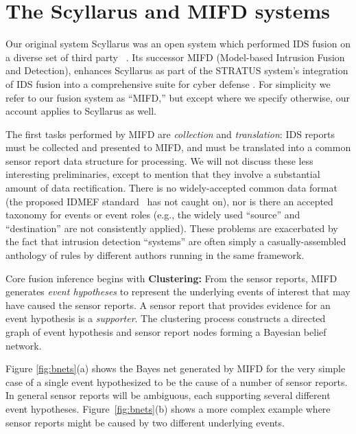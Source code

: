 \section{The Scyllarus and MIFD systems}
\label{sec:mifd}

Our original system Scyllarus was an open system which performed IDS
fusion on a diverse set of third party \idses~.
Its successor
MIFD (Model-based Intrusion Fusion and Detection),
enhances Scyllarus as part of the STRATUS system's
integration of IDS fusion into a comprehensive suite for cyber defense
.
For simplicity we refer to our \ids fusion system as ``MIFD,'' but
except where we specify otherwise, our account applies to Scyllarus as well.

The first tasks performed by MIFD are
\emph{collection} and \emph{translation}: IDS reports
must be collected and presented to MIFD, and
must be translated into a common
sensor report data structure for processing.
We will not discuss these less interesting
preliminaries, except to mention that they
involve a substantial amount of data rectification.  There is no widely-accepted
common data format (the proposed IDMEF standard~\cite{IDMEF} has not caught on), nor
is there an accepted taxonomy for events or event roles (e.g., the widely used ``source''
and ``destination'' are not consistently applied).
These problems are exacerbated by the fact that intrusion detection ``systems''
are often simply a casually-assembled anthology of rules by different authors running in the same
framework.

Core fusion inference begins with
\textbf{Clustering:} From the
sensor reports, MIFD generates \emph{event hypotheses} to represent the
underlying events of interest that may have caused the sensor reports.  A
sensor report that provides evidence for an event hypothesis is a
\emph{supporter}.
The clustering process constructs a
directed graph of event hypothesis and sensor report nodes forming a
Bayesian belief network.

Figure \ref{fig:bnets}(a) shows the Bayes net generated by MIFD for
the very simple case of a single event hypothesized to be the cause of
a number of sensor reports.  In general sensor reports will be
ambiguous, each supporting several different event hypotheses.
Figure~\ref{fig:bnets}(b) shows a more complex example where sensor reports
might be caused by two different underlying events.


